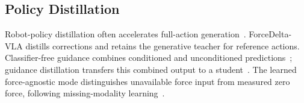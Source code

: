 \subsection{Policy Distillation}
Robot-policy distillation often accelerates full-action generation~\cite{wang2024onestepdiffusionpolicyfast,dong2026flowsteprealtimemultimodal}. ForceDelta-VLA distills corrections and retains the generative teacher for reference actions. Classifier-free guidance combines conditioned and unconditioned predictions~\cite{ho2022classifierfreediffusionguidance}; guidance distillation transfers this combined output to a student~\cite{meng2023distillationguideddiffusionmodels}. The learned force-agnostic mode distinguishes unavailable force input from measured zero force, following missing-modality learning~\cite{ramazanova2024exploringmissingmodalitymultimodal,nezakati2024mmprobustmultimodallearning}.
